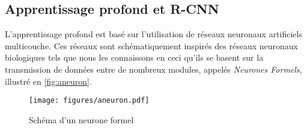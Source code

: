
		\subsection{Apprentissage profond et R-CNN}

			L'apprentissage profond est basé sur l'utilisation de réseaux neuronaux artificiels multicouche. Ces réseaux sont schématiquement inspirés des réseaux neuronaux biologiques tels que nous les connaissons en ceci qu'ils se basent sur la transmission de données entre de nombreux modules, appelés \emph{Neurones Formels}, illustré en \autoref{fig:aneuron}.
			\begin{figure}[h]
			{
				\centering
				\texttt{[image: figures/aneuron.pdf]}
				\caption{Schéma d'un neurone formel}
				\label{fig:aneuron}
			}
			\end{figure}
			
			

